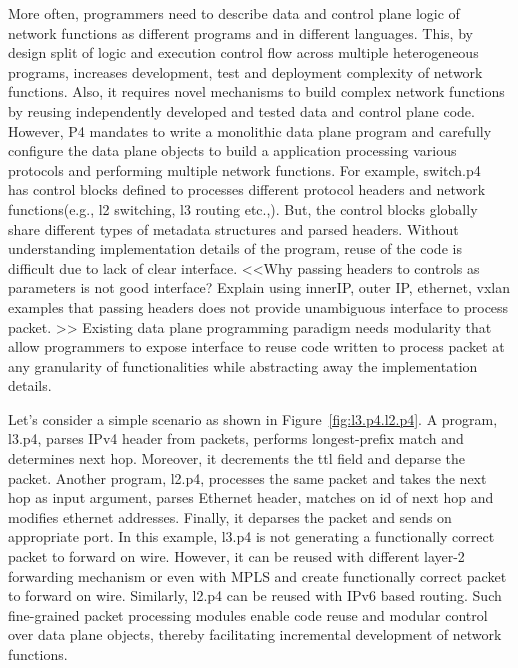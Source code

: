 \documentclass[10pt,sigconf,letterpaper,anonymous]{acmart}
\begin{document}
More often, programmers need to describe data and control plane logic of network functions as different programs and in different languages.
This, by design split of logic and execution control flow across multiple heterogeneous programs, increases development, test and deployment complexity of network functions.
Also, it requires novel mechanisms to build complex network functions by reusing independently developed and tested data and control plane code.
However, P4 mandates to write a monolithic data plane program and carefully configure the data plane objects to build a application processing various protocols and performing multiple network functions.
For example, switch.p4~\cite{switch.p4} has control blocks defined to processes different protocol headers and network functions(e.g., l2 switching, l3 routing etc.,). 
But, the control blocks globally share different types of metadata structures and parsed headers. 
Without understanding implementation details of the program, reuse of the code is difficult due to lack of clear interface.
<<Why passing headers to controls as parameters is not good interface?
Explain using innerIP, outer IP, ethernet, vxlan examples that passing headers does not provide unambiguous interface to process packet. 
>>
Existing data plane programming paradigm needs modularity that allow programmers to expose interface to reuse code written to process packet at any granularity of functionalities while abstracting away the implementation details.

Let's consider a simple scenario as shown in Figure~\ref{fig:l3.p4.l2.p4}. A program, l3.p4, parses IPv4 header from packets, performs longest-prefix match and determines next hop. 
Moreover, it decrements the ttl field and deparse the packet. 
Another program, l2.p4, processes the same packet and takes the next hop as input argument, parses Ethernet header, matches on id of next hop and modifies ethernet addresses.
Finally, it deparses the packet and sends on appropriate port.
In this example, l3.p4 is not generating a functionally correct packet to forward on wire. 
However, it can be reused with different layer-2 forwarding mechanism or even with MPLS and create functionally correct packet to forward on wire. 
Similarly, l2.p4 can be reused with IPv6 based routing.
Such fine-grained packet processing modules enable code reuse and modular control over data plane objects, thereby facilitating incremental development of network functions. 
\end{document}
